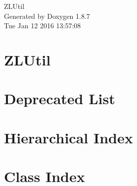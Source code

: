 \documentclass[twoside]{book}
\newcommand{\+}{\discretionary{\mbox{\scriptsize$\hookleftarrow$}}{}{}}
\newcommand{\clearemptydoublepage}{%
  \newpage{\pagestyle{empty}\cleardoublepage}%
}
\begin{document}
\hypersetup{pageanchor=false,
             bookmarks=true,
             bookmarksnumbered=true,
             pdfencoding=unicode
            }
\begin{titlepage}
\vspace*{7cm}
\begin{center}%
{\Large Z\+L\+Util }\\
\vspace*{1cm}
{\large Generated by Doxygen 1.8.7}\\
\vspace*{0.5cm}
{\small Tue Jan 12 2016 13:57:08}\\
\end{center}
\end{titlepage}
\clearemptydoublepage
\tableofcontents
\clearemptydoublepage
{}
\hypersetup{pageanchor=true}

\chapter{Z\+L\+Util}
\label{md__r_e_a_d_m_e}
\hypertarget{md__r_e_a_d_m_e}{}

\chapter{Deprecated List}
\label{deprecated}
\hypertarget{deprecated}{}

\chapter{Hierarchical Index}

\chapter{Class Index}

\end{document}
